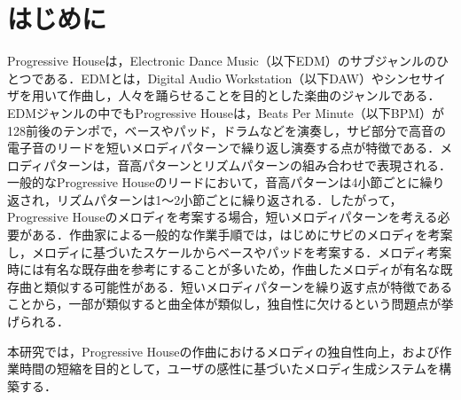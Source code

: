 \chapter{はじめに}
Progressive Houseは，Electronic Dance Music（以下EDM）のサブジャンルのひとつである\cite{Sonja18}．EDMとは，Digital Audio Workstation（以下DAW）やシンセサイザを用いて作曲し，人々を踊らせることを目的とした楽曲のジャンルである．EDMジャンルの中でもProgressive Houseは，Beats Per Minute（以下BPM）が128前後のテンポで，ベースやパッド，ドラムなどを演奏し，サビ部分で高音の電子音のリードを短いメロディパターンで繰り返し演奏する点が特徴である．メロディパターンは，音高パターンとリズムパターンの組み合わせで表現される．一般的なProgressive Houseのリードにおいて，音高パターンは4小節ごとに繰り返され，リズムパターンは1〜2小節ごとに繰り返される．したがって，Progressive Houseのメロディを考案する場合，短いメロディパターンを考える必要がある．作曲家による一般的な作業手順では，はじめにサビのメロディを考案し，メロディに基づいたスケールからベースやパッドを考案する．メロディ考案時には有名な既存曲を参考にすることが多いため，作曲したメロディが有名な既存曲と類似する可能性がある．短いメロディパターンを繰り返す点が特徴であることから，一部が類似すると曲全体が類似し，独自性に欠けるという問題点が挙げられる．

本研究では，Progressive Houseの作曲におけるメロディの独自性向上，および作業時間の短縮を目的として，ユーザの感性に基づいたメロディ生成システムを構築する．
